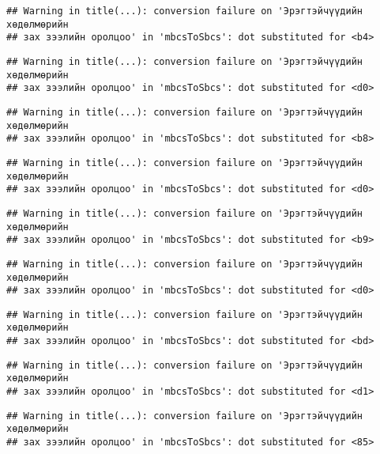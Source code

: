 \documentclass[]{article}
\begin{document}
\begin{verbatim}
## Warning in title(...): conversion failure on 'Эрэгтэйчүүдийн хөдөлмөрийн
## зах зээлийн оролцоо' in 'mbcsToSbcs': dot substituted for <b4>
\end{verbatim}

\begin{verbatim}
## Warning in title(...): conversion failure on 'Эрэгтэйчүүдийн хөдөлмөрийн
## зах зээлийн оролцоо' in 'mbcsToSbcs': dot substituted for <d0>
\end{verbatim}

\begin{verbatim}
## Warning in title(...): conversion failure on 'Эрэгтэйчүүдийн хөдөлмөрийн
## зах зээлийн оролцоо' in 'mbcsToSbcs': dot substituted for <b8>
\end{verbatim}

\begin{verbatim}
## Warning in title(...): conversion failure on 'Эрэгтэйчүүдийн хөдөлмөрийн
## зах зээлийн оролцоо' in 'mbcsToSbcs': dot substituted for <d0>
\end{verbatim}

\begin{verbatim}
## Warning in title(...): conversion failure on 'Эрэгтэйчүүдийн хөдөлмөрийн
## зах зээлийн оролцоо' in 'mbcsToSbcs': dot substituted for <b9>
\end{verbatim}

\begin{verbatim}
## Warning in title(...): conversion failure on 'Эрэгтэйчүүдийн хөдөлмөрийн
## зах зээлийн оролцоо' in 'mbcsToSbcs': dot substituted for <d0>
\end{verbatim}

\begin{verbatim}
## Warning in title(...): conversion failure on 'Эрэгтэйчүүдийн хөдөлмөрийн
## зах зээлийн оролцоо' in 'mbcsToSbcs': dot substituted for <bd>
\end{verbatim}

\begin{verbatim}
## Warning in title(...): conversion failure on 'Эрэгтэйчүүдийн хөдөлмөрийн
## зах зээлийн оролцоо' in 'mbcsToSbcs': dot substituted for <d1>
\end{verbatim}

\begin{verbatim}
## Warning in title(...): conversion failure on 'Эрэгтэйчүүдийн хөдөлмөрийн
## зах зээлийн оролцоо' in 'mbcsToSbcs': dot substituted for <85>
\end{verbatim}
\end{document}
